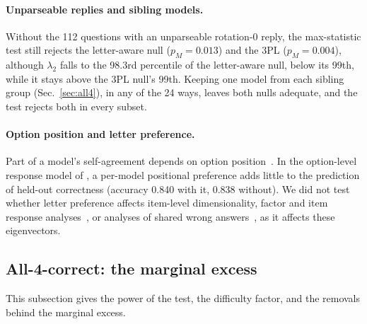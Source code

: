 \documentclass{article}
\theoremstyle{plain}
\theoremstyle{remark}
\begin{document}
\paragraph{Unparseable replies and sibling models.} Without the 112 questions with an unparseable
rotation-0 reply, the max-statistic test still rejects the letter-aware
null ($p_M=0.013$) and the 3PL ($p_M=0.004$), although $\lambda_2$
falls to the 98.3rd percentile of the letter-aware null, below its 99th,
while it stays above the 3PL null's 99th. Keeping one model from each
sibling group (Sec.~\ref{sec:all4}), in any of the 24 ways, leaves both
nulls adequate, and the test rejects both in every subset.

\paragraph{Option position and letter preference.} Part of a model's self-agreement depends on
option position~\citep{ding2026agree}. In the option-level response
model of \citet{fei2026wrong}, a per-model positional preference adds
little to the prediction of held-out correctness (accuracy 0.840 with
it, 0.838 without). We did not test whether letter preference affects
item-level dimensionality, factor and item response
analyses~\citep{metabench2025,benchscope2026,jeirt2025}, or analyses of
shared wrong answers~\citep{correlatederrors2025}, as it affects these
eigenvectors.

\subsection{All-4-correct: the marginal excess}

This subsection gives the power of the test, the difficulty factor, and
the removals behind the marginal excess.
\end{document}
